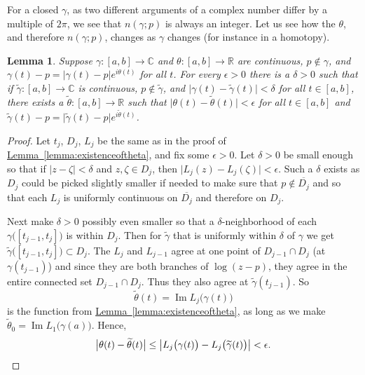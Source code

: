 \documentclass[12pt,openany]{book}
\renewcommand{\Im}{\operatorname{Im}}
\newcommand{\sabs}[1]{\lvert {#1} \rvert}
\newcommand{\babs}[1]{\bigl\lvert {#1} \bigr\rvert}
\newcommand{\C}{{\mathbb{C}}}
\newcommand{\R}{{\mathbb{R}}}
\theoremstyle{plain}
\newtheorem{lemma}[thm]{Lemma}
\theoremstyle{remark}
\theoremstyle{definition}
\theoremstyle{exercise}
\theoremstyle{example}
\newcommand{\lemmaref}[1]{\hyperref[#1]{Lemma~\ref*{#1}}}
\begin{document}
For a closed $\gamma$, as two different arguments of a complex number differ by
a multiple of $2 \pi$, we see that $n(\gamma;p)$ is always an integer.
Let us see how the $\theta$, and therefore $n(\gamma;p)$, changes 
as $\gamma$ changes (for instance in a homotopy).

\begin{lemma} \label{lemma:changeintheta}
Suppose $\gamma \colon [a,b] \to \C$ and $\theta \colon [a,b] \to \R$
are continuous, $p \notin \gamma$,
and $\gamma(t)-p = \sabs{\gamma(t)-p} e^{i\theta(t)}$ for all $t$.
For every $\epsilon > 0$ there is a $\delta > 0$ such that
if $\widetilde{\gamma} \colon [a,b] \to \C$ is continuous,
$p \notin \widetilde{\gamma}$, and
$\sabs{\gamma(t)-\widetilde{\gamma}(t)} < \delta$ for all $t \in [a,b]$,
there exists a $\widetilde{\theta} \colon [a,b] \to \R$ such that
$\sabs{\theta(t)-\widetilde{\theta}(t)} < \epsilon$ for all $t \in [a,b]$
and $\widetilde{\gamma}(t)-p = \sabs{\widetilde{\gamma}(t)-p}
e^{i\widetilde{\theta}(t)}$.
\end{lemma}

\begin{proof}
Let $t_j$, $D_j$, $L_j$ be the same as in the proof of
\lemmaref{lemma:existenceoftheta}, and fix some $\epsilon > 0$.
Let $\delta > 0$ be small enough so that if $\sabs{z-\zeta}
< \delta$ and $z,\zeta \in D_j$, then $\sabs{L_j(z)-L_j(\zeta)} < \epsilon$.
Such a $\delta$ exists as $D_j$ could be picked slightly smaller if needed
to make sure that $p \not\in \overline{D_j}$ and so that each $L_j$
is uniformly continuous on $\overline{D_j}$ and therefore on $D_j$.

Next make $\delta > 0$ possibly even smaller so that a $\delta$-neighborhood of each
$\gamma\bigl([t_{j-1},t_j]\bigr)$ is within $D_j$.  Then
for $\widetilde{\gamma}$ that is uniformly within $\delta$ of $\gamma$ we
get
$\widetilde{\gamma}\bigl([t_{j-1},t_j]\bigr) \subset D_j$.
The $L_j$ and $L_{j-1}$ agree at one point of $D_{j-1} \cap D_j$ (at
$\gamma(t_{j-1})$) and since they are both branches of $\log (z-p)$, they
agree in the entire connected set $D_{j-1} \cap D_j$.  Thus they also
agree at $\widetilde{\gamma}(t_{j-1})$.
So
\begin{equation*}
\widetilde{\theta}(t)
=
\Im L_j\bigl(\gamma(t)\bigr)
\end{equation*}
is the function from \lemmaref{lemma:existenceoftheta}, as long as we make
$\widetilde{\theta}_0 = \Im L_1\bigl(\gamma(a)\bigr)$.
Hence,
\begin{equation*}
\babs{\theta(t) - \widetilde{\theta}(t)}
\leq
\babs{
L_j\bigl(\gamma(t)\bigr)
-
L_j\bigl(\widetilde{\gamma}(t)\bigr)
}
< \epsilon. \qedhere
\end{equation*}
\end{proof}
\end{document}
